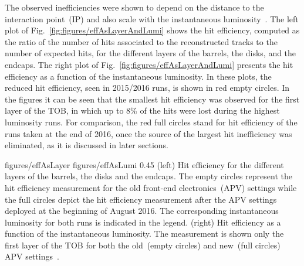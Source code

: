The observed inefficiencies were shown to depend on the distance to the interaction point~(IP) and also scale with the instantaneous luminosity~\cite{website:hitEff}. The left plot of Fig.~\ref{fig:figures/effAsLayerAndLumi} shows the hit efficiency, computed as the ratio of the number of hits associated to the reconstructed tracks to the number of expected hits, for the different layers of the barrels, the disks, and the endcaps. The right plot of Fig.~\ref{fig:figures/effAsLayerAndLumi} presents the hit efficiency as a function of the instantaneous luminosity. In these plots, the reduced hit efficiency, seen in 2015/2016 runs, is shown in red empty circles. In the figures it can be seen that the smallest hit efficiency was observed for the first layer of the TOB, in which up to 8\% of the hits were lost during the highest luminosity runs. For comparison, the red full circles stand for hit efficiency of the runs taken at the end of 2016, once the source of the largest hit inefficiency was eliminated, as it is discussed in later sections.


                 {figures/effAsLayer}
                 {figures/effAsLumi} %
                 {0.45}       %
                 {(left) Hit efficiency for the different layers of the barrels, the disks and the endcaps. The empty circles represent the hit efficiency measurement for the old front-end electronics~(APV) settings while the full circles depict the hit efficiency measurement after the APV settings deployed at the beginning of August 2016. The corresponding instantaneous luminosity for both runs is indicated in the legend. (right) Hit efficiency as a function of the instantaneous luminosity. The measurement is shown only the first layer of the TOB for both the old~(empty circles) and new~(full circles) APV settings~\cite{website:hitEff}. } %






